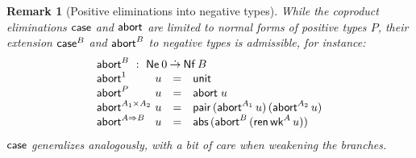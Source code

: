 \documentclass[sigconf,screen,fleqn]{acmart} %
\newtheorem{remark}{Remark}
\begin{document}
\begin{remark}[Positive eliminations into negative types]
\label{rem:abort}
While the coproduct eliminations $\mathsf{case}$ and $\mathsf{abort}$ are limited to
normal forms of positive types $P$, their extension $\mathsf{case}^B$ and
$\mathsf{abort}^B$ to negative types
is admissible, for instance:
\[
\begin{array}{l@{~}lcl}
  \multicolumn 4 l {\tabort^B ~:~ \tNe\, 0 \todot \tNf\,B} \\
  \tabort^{\tyone}     & u & = & \tunit \\
  \tabort^P           & u & = & \tabort\;u \\
  \tabort^{A_1 \times A_2} & u & = & \tpair\,(\tabort^{A_1}\,u)\,(\tabort^{A_2}\,u) \\
  \tabort^{A \To B}    & u & = & \tabs\,(\tabort^B\,(\tren\,\twk^A\,u)) \\
\end{array}
\]
$\mathsf{case}$ generalizes analogously, with a bit of care when weakening
the branches.
\end{remark}




\end{document}
